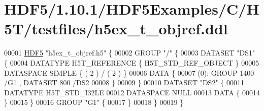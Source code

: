 \hypertarget{_h_d_f5_21_810_81_2_h_d_f5_examples_2_c_2_h5_t_2testfiles_2h5ex__t__objref_8ddl_source}{}\section{H\+D\+F5/1.10.1/\+H\+D\+F5\+Examples/\+C/\+H5\+T/testfiles/h5ex\+\_\+t\+\_\+objref.ddl}
\label{_h_d_f5_21_810_81_2_h_d_f5_examples_2_c_2_h5_t_2testfiles_2h5ex__t__objref_8ddl_source}

\begin{DoxyCode}
00001 \hyperlink{namespace_h_d_f5}{HDF5} \textcolor{stringliteral}{"h5ex\_t\_objref.h5"} \{
00002 GROUP \textcolor{stringliteral}{"/"} \{
00003    DATASET \textcolor{stringliteral}{"DS1"} \{
00004       DATATYPE  H5T\_REFERENCE \{ H5T\_STD\_REF\_OBJECT \}
00005       DATASPACE  SIMPLE \{ ( 2 ) / ( 2 ) \}
00006       DATA \{
00007       (0): GROUP 1400 /G1 , DATASET 800 /DS2 
00008       \}
00009    \}
00010    DATASET \textcolor{stringliteral}{"DS2"} \{
00011       DATATYPE  H5T\_STD\_I32LE
00012       DATASPACE  NULL
00013       DATA \{
00014       \}
00015    \}
00016    GROUP \textcolor{stringliteral}{"G1"} \{
00017    \}
00018 \}
00019 \}
\end{DoxyCode}
